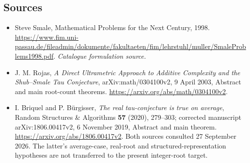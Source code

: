 \documentclass[11pt,a4paper]{article}
\numberwithin{equation}{section}
\begin{document}
\subsection{Sources}
\begin{itemize}\raggedright
\item[\textnormal{[S1]}]\hypertarget{source:statement:1}{} Steve Smale, Mathematical Problems for the Next Century, 1998.
\url{https://www.fim.uni-passau.de/fileadmin/dokumente/fakultaeten/fim/lehrstuhl/muller/SmaleProblems1998.pdf}.
{\small\textit{Catalogue formulation source.}}
\item[\textnormal{[E1]}]\hypertarget{extra:statement:1}{}
J. M. Rojas, \emph{A Direct Ultrametric Approach to Additive Complexity
and the Shub--Smale Tau Conjecture}, arXiv:math/0304100v2, 9 April 2003,
Abstract and main root-count theorems.
\url{https://arxiv.org/abs/math/0304100v2}.
\item[\textnormal{[E2]}]\hypertarget{extra:statement:2}{}
I. Briquel and P. B\"urgisser, \emph{The real tau-conjecture is true on
average}, Random Structures \& Algorithms \textbf{57} (2020), 279--303;
corrected manuscript arXiv:1806.00417v2, 6 November 2019, Abstract and
main theorem. \url{https://arxiv.org/abs/1806.00417v2}.
Both sources consulted 27 September 2026. The latter's average-case,
real-root and structured-representation hypotheses are not transferred
to the present integer-root target.
\end{itemize}
\end{document}

